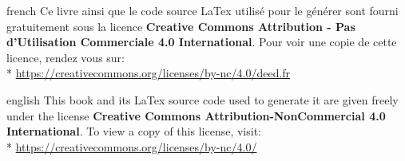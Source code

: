 \documentclass[0_Main.tex]{subfiles}
\begin{document}
\begin{shownto}{french}
Ce livre ainsi que le code source LaTex utilisé pour le générer sont fourni gratuitement sous la licence \textbf{Creative Commons Attribution - Pas d’Utilisation Commerciale 4.0 International}. Pour voir une copie de cette licence, rendez vous sur:\\* \href{https://creativecommons.org/licenses/by-nc/4.0/deed.fr}{https://creativecommons.org/licenses/by-nc/4.0/deed.fr} 
\end{shownto}

\begin{shownto}{english}
This book and its LaTex source code used to generate it are given freely under the license \textbf{Creative Commons Attribution-NonCommercial 4.0 International}. To view a copy of this license, visit:\\* \href{https://creativecommons.org/licenses/by-nc/4.0/}{https://creativecommons.org/licenses/by-nc/4.0/}
\end{shownto}
\end{document}
